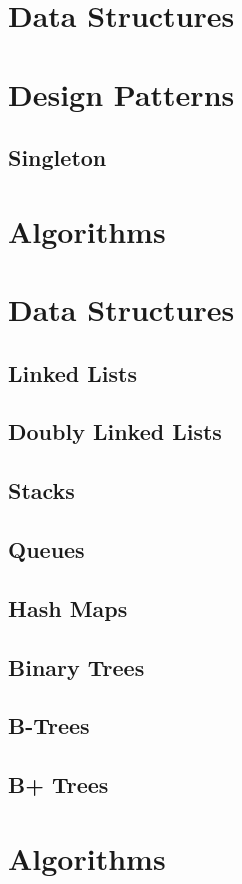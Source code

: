 \documentclass[10pt,a4paper,titlepage]{book}
\begin{document}
\chapter{Data Structures}

\vfill
\pagebreak
\chapter{Design Patterns}

\vfill
\pagebreak
\section{Singleton}

\vfill
\pagebreak
\chapter{Algorithms}

\vfill
\pagebreak
\chapter{Data Structures}

\vfill
\pagebreak
\section{Linked Lists}

\vfill
\pagebreak
\section{Doubly Linked Lists}

\vfill
\pagebreak
\section{Stacks}

\vfill
\pagebreak
\section{Queues}

\vfill
\pagebreak
\section{Hash Maps}

\vfill
\pagebreak
\section{Binary Trees}

\vfill
\pagebreak
\section{B-Trees}

\vfill
\pagebreak
\section{B+ Trees}

\vfill
\pagebreak
\chapter{Algorithms}

\vfill
\pagebreak
\end{document}

